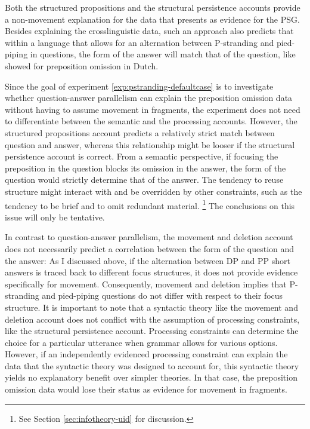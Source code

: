Both the structured pro\-positions and the structural persistence accounts provide a non-movement explanation for the data that \citet{merchant2001, merchant2004} presents as evidence for the PSG. Besides explaining the crosslinguistic data, such an approach also predicts that within a language that allows for an alternation between P-stranding and pied-piping in questions, the form of the answer will match that of the question, like \citet{levelt.kelter1982} showed for preposition omission in Dutch.

Since the goal of experiment \ref{exp:pstranding-defaultcase} is to investigate whether question-answer parallelism can explain the preposition omission data without having to assume movement in fragments, the experiment does not need to differentiate between the semantic and the processing accounts. However, the structured propositions account predicts a relatively strict match between question and answer, whereas this relationship might be looser if the structural persistence account is correct. From a semantic perspective, if focusing the preposition in the question blocks its omission in the answer, the form of the question would strictly determine that of the answer. The tendency to reuse structure might interact with and be overridden by other constraints, such as the tendency to be brief and to omit redundant material.%
%
\footnote{See Section \ref{sec:infotheory-uid} for discussion.}\afterfn%
%
The conclusions on this issue will only be tentative.

In contrast to question-answer parallelism, the movement and deletion account does not necessarily predict a correlation between the form of the question and the answer: As I discussed above, if the alternation between DP and PP short answers is traced back to different focus structures, it does not provide evidence specifically for movement. Consequently, movement and deletion implies that P-stranding and pied-piping questions do not differ with respect to their focus structure. It is important to note that a syntactic theory like the movement and deletion account does not conflict with the assumption of processing constraints, like the structural persistence account. Processing constraints can determine the choice for a particular utterance when grammar allows for various options. However, if an independently evidenced processing constraint can explain the data that the syntactic theory was designed to account for, this syntactic theory yields no explanatory benefit over simpler theories. In that case, the preposition omission data would lose their status as evidence for movement in fragments.

